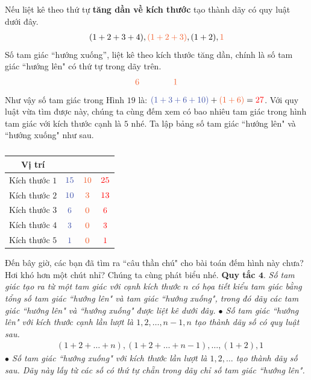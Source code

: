 Nếu liệt kê theo thứ tự {\bf\color{toancuabi} tăng dần về kích thước} tạo thành dãy có quy luật dưới đây.
\begin{align*}
	(1+2+3+4), {\color{duongvaotoanhoc}{(1+2+3)}}, (1+2), {\color{duongvaotoanhoc}{1}}
\end{align*}
Số tam giác “hướng xuống”, liệt kê theo kích thước tăng dần, chính là số tam giác ``hướng lên" có thứ tự {\color{duongvaotoanhoc}{chẵn}} trong dãy trên.
\begin{align*}
	{\color{duongvaotoanhoc}{6}	\qquad \qquad	1 }
\end{align*}
Như vậy số tam giác trong Hình $19$ là: ${\color{timhieukhoahoc}{(1+3+6+10)}} + {\color{duongvaotoanhoc}{(1+6)}} = {\color{red}{27}}$.
\vskip 0.1cm
Với quy luật vừa tìm được này, chúng ta cùng đếm xem có bao nhiêu tam giác trong hình tam giác với kích thước cạnh là $5$ nhé.
Ta lập bảng số tam giác ``hướng lên" và ``hướng xuống" như sau.
	\begin{table}[H]
	\vspace*{-5pt}
	\centering
	\captionsetup{labelformat= empty, justification=centering}
	\setlength{\tabcolsep}{5pt}
	\renewcommand{\arraystretch}{1.3}
	\begin{tabular}{|c|c|c|c|}
		\hline
		Vị trí & {\color{timhieukhoahoc}{Lên}}  & {\color{duongvaotoanhoc}{Xuống}} & {\color{red}{Tổng}}\\
		\hline
		Kích thước $1$ & ${\color{timhieukhoahoc}{15}}$ & ${\color{duongvaotoanhoc}{10}}$ &${\color{red}{25}}$\\
		\hline
		Kích thước $2$ & ${\color{timhieukhoahoc}{10}}$ & ${\color{duongvaotoanhoc}{3}}$ & ${\color{red}{13}}$\\
		\hline
		Kích thước $3$ & ${\color{timhieukhoahoc}{6}}$ & ${\color{duongvaotoanhoc}{0}}$ & ${\color{red}{6}}$\\
		\hline
		Kích thước $4$ & ${\color{timhieukhoahoc}{3}}$ & ${\color{duongvaotoanhoc}{0}}$ & ${\color{red}{3}}$\\
		\hline
		Kích thước $5$ & ${\color{timhieukhoahoc}{1}}$ & ${\color{duongvaotoanhoc}{0}}$ & ${\color{red}{1}}$ \\
		\hline
	\end{tabular}
	\caption{}
\end{table}
Đến bây giờ, các bạn đã tìm ra ``câu thần chú" cho bài toán đếm hình này chưa? Hơi khó hơn một chút nhỉ? Chúng ta cùng phát biểu nhé.
\vskip 0.1cm
{\bf\color{toancuabi} Quy tắc $\pmb{4.}$} \textit{Số tam giác tạo ra từ một tam giác với cạnh kích thước $n$ có họa tiết kiểu tam giác bằng tổng số tam giác ``hướng lên" và tam giác ``hướng xuống", trong đó dãy các tam giác ``hướng lên" và ``hướng xuống" được liệt kê dưới đây.
	\vskip 0.1cm
	$\bullet$ Số tam giác ``hướng lên" với kích thước cạnh lần lượt là $1, 2,\ldots, n-1, n$ tạo thành dãy số có quy luật sau.
	\begin{align*}
		&(1\!+\!2\!+\!\ldots\!+\!n), (1\!+\!2\!+\!\ldots\!+\! n\!-\!1), \ldots,(1\!+\!2), 1 
	\end{align*}
	$\bullet$ Số tam giác ``hướng xuống" với kích thước lần lượt là $1, 2,\ldots$ tạo thành dãy số sau. Dãy này lấy từ các số có thứ tự chẵn trong dãy chỉ số tam giác ``hướng lên".}
